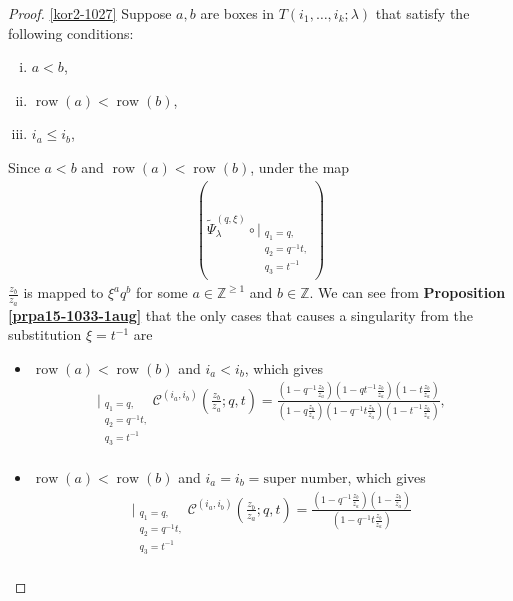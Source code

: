 \documentclass[12pt,reqno,a4paper]{amsart}
\newcommand{\comp}{\circ}
\newcommand{\cals}[1]{\mathcal{#1}}
\newcommand{\bb}[1]{\mathbb{#1}}
\numberwithin{equation}{section}
\newcommand{\dualmap}{
\widetilde{\Psi}^{(q,\xi)}_{\lambda}
}
\theoremstyle{definition}
\begin{document}
\begin{proof}
\eqref{kor2-1027} Suppose 
$a,b$ are boxes in $T(i_1,\dots,i_k;\lambda)$ that satisfy the following conditions:
\begin{enumerate}[(i)]
	\item $a < b $,
	\item $\operatorname{row}(a) < \operatorname{row}(b)$,
	\item $i_a \leq i_b$,
\end{enumerate}
Since $a < b$ and $\operatorname{row}(a) < \operatorname{row}(b)$, under the map 
\begin{align}
	(
	\dualmap
	\comp 
	\bigg|_{
		\substack{
			q_1 = q, \\
			q_2 = q^{-1}t,\\
			q_3 = t^{-1} \\
		}
	}
	)
\end{align}
$\displaystyle \frac{z_b}{z_a}$ is mapped to $\xi^aq^b$ for some $a \in \bb{Z}^{\geq 1}$ and $b \in \bb{Z}$. We can see from \textbf{Proposition \ref{prpa15-1033-1aug}} that the only cases that causes a singularity from the substitution $\xi = t^{-1}$ are 
\begin{itemize}
	\item
	$\operatorname{row}(a) < \operatorname{row}(b)$ and $i_a < i_b$, which gives 
	\footnotesize
	\begin{align}
		\bigg|_{
			\substack{
				q_1 = q, \\
				q_2 = q^{-1}t,\\
				q_3 = t^{-1} \\
			}
		}
		\cals{C}^{(i_a,i_b)}\left(
		\frac{z_b}{z_a}
		; q, t
		\right)
		= 
		\frac{
			\left(1 - q^{-1}\frac{z_b}{z_a}\right)
			\left(1 - qt^{-1}\frac{z_b}{z_a}\right)
			\left(1 - t\frac{z_b}{z_a}\right)
		}{
			\left(1 - q\frac{z_b}{z_a}\right)
			\left(1 - q^{-1}t\frac{z_b}{z_a}\right)
			\left(1 - t^{-1}\frac{z_b}{z_a}\right)
		}, 
	\end{align}
	\normalsize
	\item 
	$\operatorname{row}(a) < \operatorname{row}(b)$ and $i_a = i_b = \text{super number}$, which gives 
	\footnotesize
	\begin{align}
		\bigg|_{
			\substack{
				q_1 = q, \\
				q_2 = q^{-1}t,\\
				q_3 = t^{-1} \\
			}
		}
		\cals{C}^{(i_a,i_b)}\left(
		\frac{z_b}{z_a}
		; q, t
		\right)
		= 
		\frac{
			\left(1 - q^{-1}\frac{z_b}{z_a}\right)
			\left(1 - \frac{z_b}{z_a}\right)
		}{
			\left(1 - q^{-1}t\frac{z_b}{z_a}\right)
}
\end{align}
\end{itemize}
\end{proof}
\end{document}
